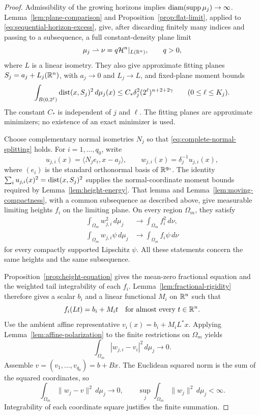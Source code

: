 \begin{proof}
Admissibility of the growing horizons implies
$\operatorname{diam}(\operatorname{supp}\mu_j)\to\infty$.
Lemma~\ref{lem:plane-comparison} and
Proposition~\ref{prop:flat-limit}, applied to
\eqref{eq:sequential-horizon-excess}, give, after discarding finitely
many indices and passing to a subsequence, a full constant-density plane
limit
\[
 \mu_j\rightharpoonup\nu=q\mathcal H^n|_{L(\mathbb R^n)},\qquad q>0,
\]
where $L$ is a linear isometry. They also give approximate
fitting planes $S_j=a_j+L_j(\mathbb R^n)$, with $a_j\to0$ and $L_j\to L$,
and fixed-plane moment bounds
\begin{equation}\label{eq:prop-fixed-plane-moments}
 \int_{B(0,2^\ell)}\operatorname{dist}(x,S_j)^2\,d\mu_j(x)
 \le C_*\delta_j^2(2^\ell)^{n+2+2\gamma}
       \qquad(0\le\ell\le K_j).
\end{equation}
The constant $C_*$ is independent of $j$ and $\ell$.
The fitting planes are approximate minimizers; no existence of an exact
minimizer is used.

Choose complementary normal isometries $N_j$ so that
\eqref{eq:complete-normal-splitting} holds. For
$i=1,\dots,q_0$, write
\[
 u_{j,i}(x)=\langle N_je_i,x-a_j\rangle,
 \qquad w_{j,i}(x)=\delta_j^{-1}u_{j,i}(x),
\]
where $(e_i)$ is the standard orthonormal basis of $\mathbb R^{q_0}$.
The identity
$\sum_i u_{j,i}(x)^2=\operatorname{dist}(x,S_j)^2$ supplies the normal-coordinate
moment bounds required by Lemma~\ref{lem:height-energy}.
That lemma and Lemma~\ref{lem:moving-compactness}, with a common
subsequence as described above, give measurable limiting heights $f_i$
on the limiting plane. On every region $\Omega_m$, they satisfy
\begin{align}
 \int_{\Omega_m}w_{j,i}^2\,d\mu_j
   &\longrightarrow\int_{\Omega_m}f_i^2\,d\nu,
       \label{eq:normal-coordinate-norm-limit}\\
 \int_{\Omega_m}w_{j,i}\psi\,d\mu_j
   &\longrightarrow\int_{\Omega_m}f_i\psi\,d\nu
       \label{eq:normal-coordinate-signed-limit}
\end{align}
for every compactly supported Lipschitz $\psi$.
All these statements concern the same heights and the same subsequence.

Proposition~\ref{prop:height-equation} gives the mean-zero fractional
equation and the weighted tail integrability of each $f_i$.
Lemma~\ref{lem:fractional-rigidity} therefore gives a scalar $b_i$ and
a linear functional $M_i$ on $\mathbb R^n$ such that
\[
 f_i(Lt)=b_i+M_it\quad\text{for almost every }t\in\mathbb R^n.
\]
Use the ambient affine representative
$v_i(x)=b_i+M_iL^*x$. Applying
Lemma~\ref{lem:affine-polarization} to the finite restrictions on
$\Omega_m$ yields
\[
 \int_{\Omega_m}|w_{j,i}-v_i|^2\,d\mu_j\longrightarrow0.
\]
Assemble $v=(v_1,\dots,v_{q_0})=b+Bx$.
The Euclidean squared norm is the sum of the squared coordinates, so
\begin{equation}\label{eq:vector-affine-strong-limit}
 \int_{\Omega_m}\|w_j-v\|^2\,d\mu_j\longrightarrow0,
 \qquad \sup_j\int_{\Omega_m}\|w_j\|^2\,d\mu_j<\infty.
\end{equation}
Integrability of each coordinate square justifies the finite summation.


\end{proof}
